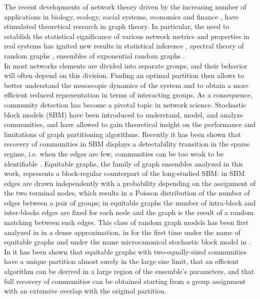 \documentclass[%
 reprint,
 amsmath,amssymb,
 aps,
 pre,
 showpacs
]{revtex4-1}
\begin{document}
The recent developments of network theory driven by the increasing number of applications in biology, ecology, social systems, economics and finance \cite{newman2006structure,easley2010networks}, have stimulated theoretical research in graph theory. In particular, the need to establish the statistical significance of various network metrics and properties in real systems has ignited new results in statistical inference \cite{decelle2011inference}, spectral theory of random graphs \cite{rogers2008cavity,chung2003eigenvalues,erdos2013spectral,farkas2001spectra,bordenave2010resolvent,nadakuditi2012graph}, ensembles of exponential random graphs \cite{robins2007introduction}. \\
In most networks elements are divided into separate groups, and their behavior will often depend on this division. Finding an optimal partition then allows to better understand the mesoscopic dynamics of the system and to obtain a more efficient reduced representation in terms of interacting groups. As a consequence, community detection has become a pivotal topic in network science. Stochastic block models (SBM) \cite{holland1983stochastic,karrer2011stochastic} have been introduced to understand, model, and analyze communities, and have allowed to gain theoretical insight on the performance and limitations of graph partitioning algorithms.
Recently it has been shown that recovery of communities in SBM displays a detectability transition in the sparse regime, i.e. when the edges are few, communities can be too weak to be identifiable \cite{decelle2011inference,decelle2011asymptotic}.
Equitable graphs, the family of graph ensembles analyzed in this work, represents a block-regular counterpart of the long-studied SBM: in SBM edges are drawn independently with a probability depending on the assignment of the two terminal nodes, which results in a Poisson distribution of the number of edges between a pair of groups; in equitable graphs the number of intra-block and inter-blocks edges are fixed for each node and the graph is the result of a random matching between such edges. This class of random graph models has been first analyzed in \cite{radicchi2013detectability} in a dense approximation, in \cite{newman2014equitable} for the first time under the name of equitable graphs and under the name microcanonical stochastic block model in \cite{peixoto2016nonparametric}. In \cite{brito2016recovery} it has been shown that equitable graphs with two-equally-sized communities have a unique partition almost surely in the large size limit, that an efficient algorithm can be derived in a large region of the ensemble's parameters, and that full recovery of communities can be obtained starting from a group assignment with an extensive overlap with the original partition.
\end{document}
